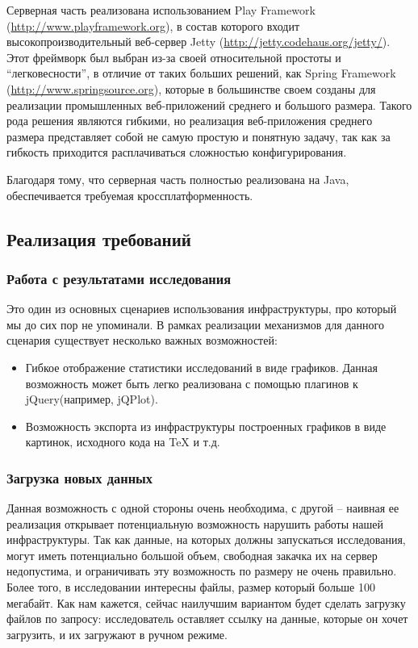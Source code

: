 \documentclass[12pt,a4paper]{extarticle}
\begin{document}
Серверная часть реализована использованием Play Framework (\url{http://www.playframework.org}), в состав 
которого входит высокопроизводительный веб-сервер Jetty (\url{http://jetty.codehaus.org/jetty/}). Этот фреймворк был выбран из-за своей относительной простоты и ``легковесности'', в отличие от таких больших решений, как Spring Framework (\url{http://www.springsource.org}), 
которые в большинстве своем созданы для реализации промышленных веб-приложений среднего и большого размера. Такого рода решения являются гибкими, но реализация веб-приложения среднего размера представляет собой не самую простую и понятную задачу, так как за гибкость приходится расплачиваться сложностью конфигурирования.

Благодаря тому, что серверная часть полностью реализована на Java, обеспечивается требуемая кроссплатформенность.

\subsection{Реализация требований}
\subsubsection{Работа с результатами исследования}
Это один из основных сценариев использования инфраструктуры, про который мы до сих пор не упоминали. В рамках реализации механизмов для данного сценария существует несколько важных возможностей:
\begin{itemize}
	\item Гибкое отображение статистики исследований в виде графиков. Данная возможность может быть легко реализована с помощью плагинов к jQuery(например, jQPlot).
	\item Возможность экспорта из инфраструктуры построенных графиков в виде картинок, исходного кода на TeX и т.д.
\end{itemize}

\subsubsection{Загрузка новых данных}
Данная возможность с одной стороны очень необходима, с другой -- наивная ее реализация открывает потенциальную возможность нарушить работы нашей инфраструктуры. Так как данные, на которых должны запускаться исследования, могут иметь потенциально большой объем, свободная закачка их на сервер недопустима, и ограничивать эту возможность по размеру не очень правильно. Более того, в исследовании интересны файлы, размер который больше 100 мегабайт. Как нам кажется, сейчас наилучшим вариантом будет сделать загрузку файлов по запросу: исследователь оставляет ссылку на данные, которые он хочет загрузить, и их загружают в ручном режиме.
\end{document}
